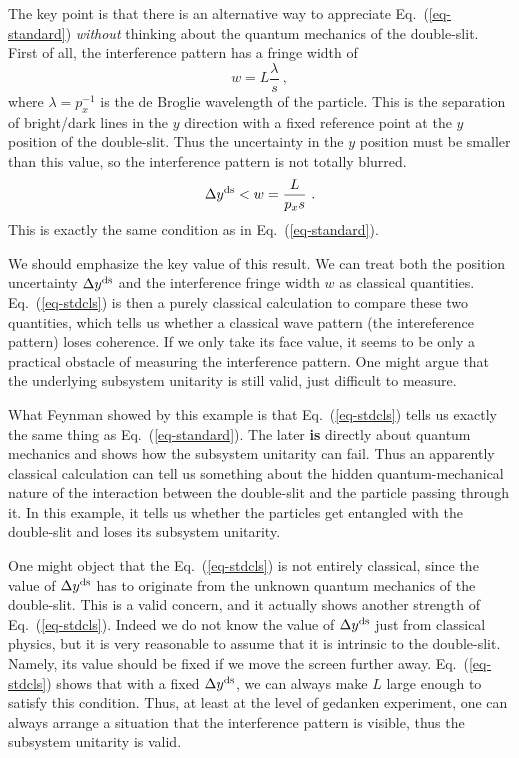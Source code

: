 \documentclass[aps,showpacs,twocolumn,floats,prd,superscriptaddress,nofootinbib]{revtex4-1}
\begin{document}
The key point is that there is an alternative way to appreciate Eq.~(\ref{eq-standard}) {\it without} thinking about the quantum mechanics of the double-slit. 
First of all, the interference pattern has a fringe width of  
\begin{equation}
w = L\frac{\lambda}{s}~,
\end{equation}
where $\lambda = p_x^{-1}$ is the de Broglie wavelength of the particle. This is the separation of bright/dark lines in the $y$ direction with a fixed reference point at the $y$ position of the double-slit. Thus the uncertainty in the $y$ position must be smaller than this value, so the interference pattern is not totally blurred.
\begin{equation}
\Delta y^{\rm ds} < w = \frac{L}{p_xs}~.
\label{eq-stdcls}
\end{equation}
This is exactly the same condition as in Eq.~(\ref{eq-standard}).

We should emphasize the key value of this result. 
We can treat both the position uncertainty $\Delta y^{\rm ds}$ and the interference fringe width $w$ as classical quantities. Eq.~(\ref{eq-stdcls}) is then a purely classical calculation to compare these two quantities, which tells us whether a classical wave pattern (the intereference pattern) loses coherence. 
If we only take its face value, it seems to be only a practical obstacle of measuring the interference pattern. 
One might argue that the underlying subsystem unitarity is still valid, just difficult to measure. 

What Feynman showed by this example is that Eq.~(\ref{eq-stdcls}) tells us exactly the same thing as Eq.~(\ref{eq-standard}). 
The later {\bf is} directly about quantum mechanics and shows how the subsystem unitarity can fail. 
Thus an apparently classical calculation can tell us something about the hidden quantum-mechanical nature of the interaction between the double-slit and the particle passing through it. 
In this example, it tells us whether the particles get entangled with the double-slit and loses its subsystem unitarity. 

One might object that the Eq.~(\ref{eq-stdcls}) is not entirely classical, since the value of $\Delta y^{\rm ds}$ has to originate from the unknown quantum mechanics of the double-slit. 
This is a valid concern, and it actually shows another strength of Eq.~(\ref{eq-stdcls}). 
Indeed we do not know the value of $\Delta y^{\rm ds}$ just from classical physics, but it is very reasonable to assume that it is intrinsic to the double-slit. 
Namely, its value should be fixed if we move the screen further away. Eq.~(\ref{eq-stdcls}) shows that with a fixed $\Delta y^{\rm ds}$, we can always make $L$ large enough to satisfy this condition. 
Thus, at least at the level of gedanken experiment, one can always arrange a situation that the interference pattern is visible, thus the subsystem unitarity is valid.
\end{document}
